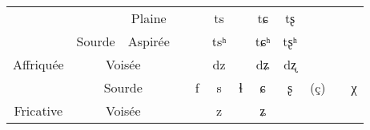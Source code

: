 \documentclass[11pt, a4paper]{book}              %
\newcommand{\ipa}[1]{{\phon \mbox{#1}}} %
\begin{document}
\begin{table}[H]
{\begin{tabular}{|c|c|c|c|c|c|c|c|c|c|c|c|}
\cellcolor[HTML]{C0C0C0}                            & \cellcolor[HTML]{EFEFEF}                         & \cellcolor[HTML]{EFEFEF}Plaine  & \cellcolor[HTML]{9B9B9B}                   & \cellcolor[HTML]{9B9B9B}  & \ipa{ts}                                   & \cellcolor[HTML]{9B9B9B}{\color[HTML]{333333} } & \ipa{tɕ}                                   & \ipa{tʂ}                  & \cellcolor[HTML]{9B9B9B}       & \cellcolor[HTML]{9B9B9B}       & \cellcolor[HTML]{9B9B9B}  \\ \cline{3-12} 
\cellcolor[HTML]{C0C0C0}                            & \multirow{-2}{*}{\cellcolor[HTML]{EFEFEF}Sourde} & \cellcolor[HTML]{EFEFEF}Aspirée & \cellcolor[HTML]{9B9B9B}                   & \cellcolor[HTML]{9B9B9B}  & \ipa{tsʰ}                                  & \cellcolor[HTML]{9B9B9B}{\color[HTML]{333333} } & \ipa{tɕʰ}                                  & \ipa{tʂʰ}                 & \cellcolor[HTML]{9B9B9B}       & \cellcolor[HTML]{9B9B9B}       & \cellcolor[HTML]{9B9B9B}  \\ \cline{2-12} 
\multirow{-3}{*}{\cellcolor[HTML]{C0C0C0}Affriquée} & \multicolumn{2}{c|}{\cellcolor[HTML]{EFEFEF}Voisée}                                & \cellcolor[HTML]{9B9B9B}                   & \cellcolor[HTML]{9B9B9B}  & \ipa{dz}                                   & \cellcolor[HTML]{9B9B9B}{\color[HTML]{333333} } & \ipa{dʑ}                                   & \ipa{dʐ}                  & \cellcolor[HTML]{9B9B9B}       & \cellcolor[HTML]{9B9B9B}       & \cellcolor[HTML]{9B9B9B}  \\ \hline
\cellcolor[HTML]{C0C0C0}                            & \multicolumn{2}{c|}{\cellcolor[HTML]{EFEFEF}Sourde}                                & \cellcolor[HTML]{9B9B9B}                   & \ipa{f}                   & \ipa{s}                                    & \ipa{ɬ}                                         & \ipa{ɕ}                                    & \ipa{ʂ}                   & (\ipa{ç})                      & \cellcolor[HTML]{9B9B9B}       & \ipa{χ}                   \\ \cline{2-12} 
\multirow{-2}{*}{\cellcolor[HTML]{C0C0C0}Fricative} & \multicolumn{2}{c|}{\cellcolor[HTML]{EFEFEF}Voisée}                                & \cellcolor[HTML]{9B9B9B}                   & \cellcolor[HTML]{9B9B9B}  & \ipa{z}                                    & \cellcolor[HTML]{9B9B9B}                        & \ipa{ʑ}                                    & \cellcolor[HTML]{9B9B9B}  & \cellcolor[HTML]{9B9B9B}       & \cellcolor[HTML]{9B9B9B}       & \cellcolor[HTML]{9B9B9B}  \\ \hline

\end{tabular}}
\end{table}
\end{document}
